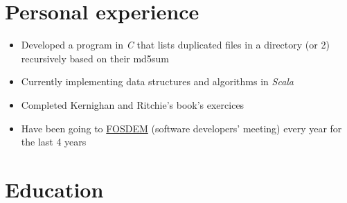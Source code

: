 \documentclass[11pt,a4paper,sans]{moderncv}        %
\begin{document}
\vspace{0.2em}


\vspace{0.2em}


\section{Personal experience}
\vspace{0.7em}

\begin{itemize}
  \item Developed a program in \textit{C} that lists duplicated files in a directory (or 2) recursively based on their md5sum \href{https://github.com/bnjzer/findDuplicatesByHash}{\faGithub}
  \item Currently implementing data structures and algorithms in \textit{Scala} \href{https://github.com/bnjzer/dataStructsAlgos}{\faGithub}
  \item Completed Kernighan and Ritchie's book's exercices \href{https://github.com/bnjzer/c}{\faGithub}
  \item Have been going to \href{https://fosdem.org}{\faExternalLink{} FOSDEM} (software developers' meeting) every year for the last 4 years
\end{itemize}

\section{Education}
\vspace{0.7em}


\vspace{0.2em}
\end{document}
